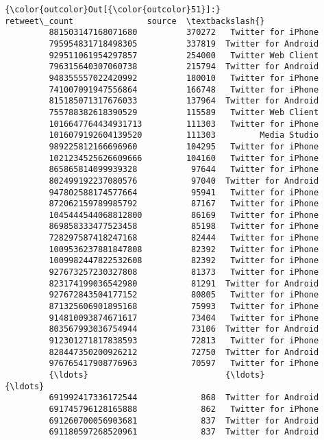 \documentclass[11pt]{article}
\begin{document}
\begin{Verbatim}[commandchars=\\\{\}]
{\color{outcolor}Out[{\color{outcolor}51}]:}                      retweet\_count               source  \textbackslash{}
         881503147168071680          370272   Twitter for iPhone   
         795954831718498305          337819  Twitter for Android   
         929511061954297857          254000   Twitter Web Client   
         796315640307060738          215794  Twitter for Android   
         948355557022420992          180010   Twitter for iPhone   
         741007091947556864          166748   Twitter for iPhone   
         815185071317676033          137964  Twitter for Android   
         755788382618390529          115589   Twitter Web Client   
         1016647764434931713         111303   Twitter for iPhone   
         1016079192604139520         111303         Media Studio   
         989225812166696960          104295   Twitter for iPhone   
         1021234525626609666         104160   Twitter for iPhone   
         865865814099939328           97644   Twitter for iPhone   
         802499192237080576           97040  Twitter for Android   
         947802588174577664           95941   Twitter for iPhone   
         872062159789985792           87167   Twitter for iPhone   
         1045444544068812800          86169   Twitter for iPhone   
         869858333477523458           85198   Twitter for iPhone   
         728297587418247168           82444   Twitter for iPhone   
         1009536237881847808          82392   Twitter for iPhone   
         1009982447822532608          82392   Twitter for iPhone   
         927673257230327808           81373   Twitter for iPhone   
         823174199036542980           81291  Twitter for Android   
         927672843504177152           80805   Twitter for iPhone   
         871325606901895168           75993   Twitter for iPhone   
         914810093874671617           73404   Twitter for iPhone   
         803567993036754944           73106  Twitter for Android   
         912301271817838593           72813   Twitter for iPhone   
         828447350200926212           72750  Twitter for Android   
         976765417908776963           70597   Twitter for iPhone   
         {\ldots}                            {\ldots}                  {\ldots}   
         691992417336172544             868  Twitter for Android   
         691745796128165888             862   Twitter for iPhone   
         691260700056903681             837  Twitter for Android   
         691180597268520961             837  Twitter for Android   

\end{Verbatim}
\end{document}
